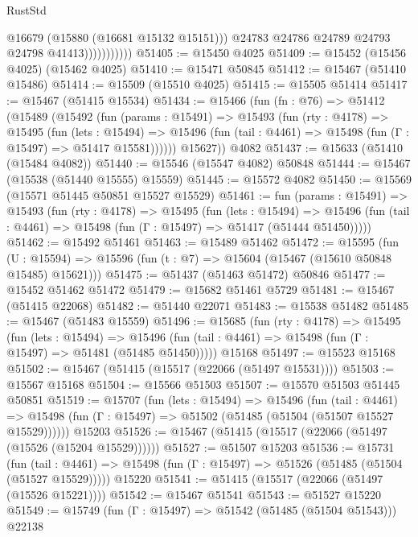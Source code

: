\begin{lexlean}{RustStd}
\begin{coremodule}
                            @16679
                            (@15880 (@16681 @15132 @15151)))
                          @24783
                          @24786
                          @24789
                          @24793
                          @24798
                          @41413)))))))))))
@51405 := @15450 @4025
@51409 := @15452 (@15456 @4025) (@15462 @4025)
@51410 := @15471 @50845
@51412 := @15467 (@51410 @15486)
@51414 := @15509 (@15510 @4025)
@51415 := @15505 @51414
@51417 := @15467 (@51415 @15534)
@51434 := @15466
    (fun (fn : @76) =>
    @51412
      (@15489
        (@15492
          (fun (params : @15491) =>
          @15493
            (fun (rty : @4178) =>
            @15495
              (fun (lets : @15494) =>
              @15496 (fun (tail : @4461) => @15498 (fun (Γ : @15497) => @51417 @15581))))))
        @15627))
    @4082
@51437 := @15633 (@51410 (@15484 @4082))
@51440 := @15546 (@15547 @4082) @50848
@51444 := @15467 (@15538 (@51440 @15555) @15559)
@51445 := @15572 @4082
@51450 := @15569 (@15571 @51445 @50851 @15527 @15529)
@51461 := fun (params : @15491) =>
  @15493
    (fun (rty : @4178) =>
    @15495
      (fun (lets : @15494) =>
      @15496 (fun (tail : @4461) => @15498 (fun (Γ : @15497) => @51417 (@51444 @51450)))))
@51462 := @15492 @51461
@51463 := @15489 @51462
@51472 := @15595
    (fun (U : @15594) => @15596 (fun (t : @7) => @15604 (@15467 (@15610 @50848 @15485) @15621)))
@51475 := @51437 (@51463 @51472) @50846
@51477 := @15452 @51462 @51472
@51479 := @15682 @51461 @5729
@51481 := @15467 (@51415 @22068)
@51482 := @51440 @22071
@51483 := @15538 @51482
@51485 := @15467 (@51483 @15559)
@51496 := @15685
    (fun (rty : @4178) =>
    @15495
      (fun (lets : @15494) =>
      @15496 (fun (tail : @4461) => @15498 (fun (Γ : @15497) => @51481 (@51485 @51450)))))
    @15168
@51497 := @15523 @15168
@51502 := @15467 (@51415 (@15517 (@22066 (@51497 @15531))))
@51503 := @15567 @15168
@51504 := @15566 @51503
@51507 := @15570 @51503 @51445 @50851
@51519 := @15707
    (fun (lets : @15494) =>
    @15496
      (fun (tail : @4461) =>
      @15498 (fun (Γ : @15497) => @51502 (@51485 (@51504 (@51507 @15527 @15529))))))
    @15203
@51526 := @15467 (@51415 (@15517 (@22066 (@51497 (@15526 (@15204 @15529))))))
@51527 := @51507 @15203
@51536 := @15731
    (fun (tail : @4461) => @15498 (fun (Γ : @15497) => @51526 (@51485 (@51504 (@51527 @15529)))))
    @15220
@51541 := @51415 (@15517 (@22066 (@51497 (@15526 @15221))))
@51542 := @15467 @51541
@51543 := @51527 @15220
@51549 := @15749 (fun (Γ : @15497) => @51542 (@51485 (@51504 @51543))) @22138

\end{coremodule}
\end{lexlean}
